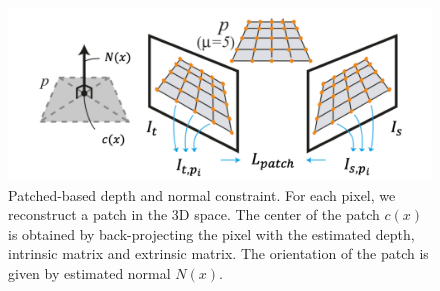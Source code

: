 \documentclass[10pt,twocolumn,letterpaper]{article}
\begin{document}
\begin{figure}
  \includegraphics[width=\columnwidth ]{patch.png}
  \caption{Patched-based depth and normal constraint. For each pixel, we reconstruct a patch in the 3D space. The center of the patch $c(x)$ is obtained by back-projecting the pixel with the estimated depth, intrinsic matrix and extrinsic matrix. The orientation of the patch is given by estimated normal $N(x)$.}
  \label{fig:patch}
\end{figure}
\end{document}
